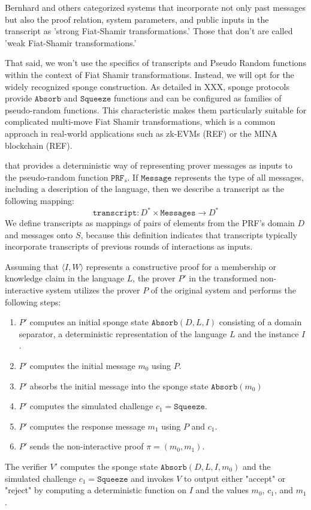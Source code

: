 Bernhard and others categorized systems that incorporate not only past messages but also the proof relation, system parameters, and public inputs in the transcript as 'strong Fiat-Shamir transformations.' Those that don't are called 'weak Fiat-Shamir transformations.'

That said, we won't use the specifics of transcripts and Pseudo Random functions within the context of Fiat Shamir transformations. Instead, we will opt for the widely recognized sponge construction. As detailed in XXX, sponge protocols provide $\mathtt{Absorb}$ and $\mathtt{Squeeze}$ functions and can be configured as families of pseudo-random functions. This characteristic makes them particularly suitable for complicated multi-move Fiat Shamir transformations, which is a common approach in real-world applications such as zk-EVMs (REF) or the MINA blockchain (REF).

that provides a deterministic way of representing prover messages as inputs to the pseudo-random function $\mathtt{PRF}_s$. If $\mathtt{Message}$ represents the type of all messages, including a description of the language, then we describe a transcript as the following mapping:
\begin{equation}
\mathtt{transcript}: D^*\times\mathtt{Messages} \to D^*    
\end{equation}
We define transcripts as mappings of pairs of elements from the PRF's domain $D$ and messages onto $S$, because this definition indicates that transcripts typically incorporate transcripts of previous rounds of interactions as inputs.

Assuming that $\langle I, W\rangle$ represents a constructive proof for a membership or knowledge claim in the language $L$, the prover $P'$ in the transformed non-interactive system utilizes the prover $P$ of the original system and performs the following steps:
\begin{enumerate}
\label{def_sigma-model-fiat-shamir}
\item $P'$ computes an initial sponge state $\mathtt{Absorb}(D,L,I)$ consisting of a domain separator, a deterministic representation of the language $L$ and the instance $I$.
\item $P'$ computes the initial message $m_0$ using $P$.
\item $P'$ absorbs the initial message into the sponge state $\mathtt{Absorb}(m_0)$
\item $P'$ computes the simulated challenge $c_1=\mathtt{Squeeze}$.
\item $P'$ computes the response message $m_1$ using $P$ and $c_1$.
\item $P'$ sends the non-interactive proof $\pi=(m_0,m_1)$.
\end{enumerate}
The verifier $V'$ computes the sponge state $\mathtt{Absorb}(D,L,I,m_0)$ and the simulated challenge $c_1=\mathtt{Squeeze}$ and invokes $V$ to output either "accept" or "reject" by computing a deterministic function on $I$ and the values $m_0$, $c_1$, and $m_1$.


